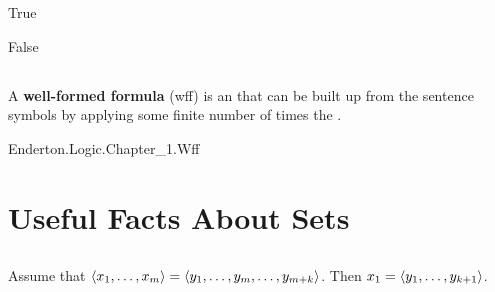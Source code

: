 \documentclass{report}
\begin{document}
    {True}

    {False}

\section{}%

  A \textbf{well-formed formula} (wff) is an  that can
    be built up from the sentence symbols by applying some finite number of
    times the .

    {Enderton.Logic.Chapter\_1.Wff}

\endgroup

\setcounter{chapter}{0}
\addtocounter{chapter}{-1}
\chapter{Useful Facts About Sets}%

\section{}%

  \begin{lemma}[0A]
    Assume that $\left< x_1, \ldots, x_m \right> = \left< y_1, \ldots, y_m, \ldots, y_{m+k} \right>$.
    Then $x_1 = \left< y_1, \ldots, y_{k+1} \right>$.
  \end{lemma}
\end{document}
